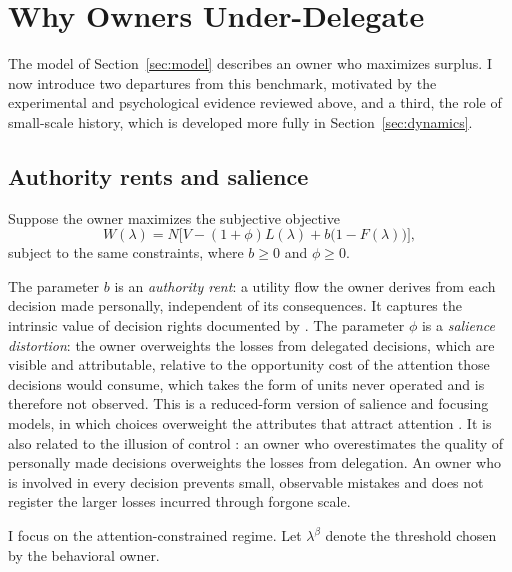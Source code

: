\documentclass[11pt,a4paper]{article}
\theoremstyle{plain}
\begin{document}
\section{Why Owners Under-Delegate}\label{sec:behavioral}

The model of Section~\ref{sec:model} describes an owner who maximizes surplus. I now introduce two departures from this benchmark, motivated by the experimental and psychological evidence reviewed above, and a third, the role of small-scale history, which is developed more fully in Section~\ref{sec:dynamics}.

\subsection{Authority rents and salience}

Suppose the owner maximizes the subjective objective
\begin{equation}\label{eq:W}
  W(\lambda) = N \Big[ V - (1 + \phi) L(\lambda) + b \big(1 - F(\lambda)\big) \Big],
\end{equation}
subject to the same constraints, where $b \ge 0$ and $\phi \ge 0$.

The parameter $b$ is an \emph{authority rent}: a utility flow the owner derives from each decision made personally, independent of its consequences. It captures the intrinsic value of decision rights documented by \citet{bartling2014}. The parameter $\phi$ is a \emph{salience distortion}: the owner overweights the losses from delegated decisions, which are visible and attributable, relative to the opportunity cost of the attention those decisions would consume, which takes the form of units never operated and is therefore not observed. This is a reduced-form version of salience and focusing models, in which choices overweight the attributes that attract attention \citep{bordalo2012,koszegi2013}. It is also related to the illusion of control \citep{langer1975}: an owner who overestimates the quality of personally made decisions overweights the losses from delegation. An owner who is involved in every decision prevents small, observable mistakes and does not register the larger losses incurred through forgone scale.

I focus on the attention-constrained regime. Let $\lambda^\beta$ denote the threshold chosen by the behavioral owner.
\end{document}
